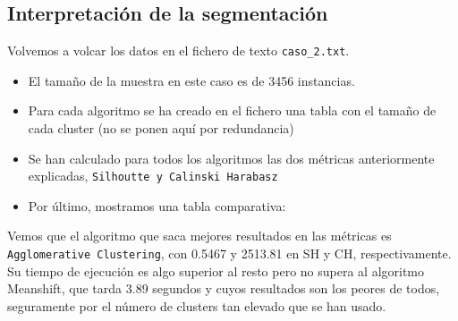	\subsection{Interpretación de la segmentación}
	
	Volvemos a volcar los datos en el fichero de texto \texttt{caso\_2.txt}.
	
	
	\begin{itemize}
		\item El tamaño de la muestra en este caso es de 3456 instancias.
		\item Para cada algoritmo se ha creado en el fichero una tabla con el tamaño de cada cluster (no se ponen aquí por redundancia)
		
		\item Se han calculado para todos los algoritmos las dos métricas anteriormente explicadas, \texttt{Silhoutte y Calinski Harabasz}
		
		\item Por último, mostramos una tabla comparativa:
	\end{itemize}
	
	
	\begin{table}[H]
	\end{table}




	Vemos que el algoritmo que saca mejores resultados en las métricas es \texttt{Agglomerative Clustering}, con 0.5467 y 2513.81 en SH y CH, respectivamente. Su tiempo de ejecución es algo superior al resto pero no supera al algoritmo Meanshift, que tarda 3.89 segundos y cuyos resultados son los peores de todos, seguramente por el número de clusters tan elevado que se han usado. \\
	

